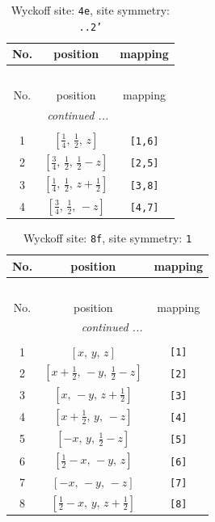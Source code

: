 \documentclass[fleqn,8pt]{jsarticle}
\begin{document}
\renewcommand{\arraystretch}{1.2}
\begin{longtable}{ccc}
\caption{Wyckoff site: {\tt 4e}, site symmetry: {\tt ..2'}}
 \\
 \hline \hline
No. & position & mapping \\ \hline \endfirsthead

\multicolumn{2}{l}{\tablename\ \thetable{}} \\
 \hline \hline
No. & position & mapping \\ \hline \endhead

 \hline \hline
\multicolumn{2}{r}{\footnotesize\it continued ...} \\ \endfoot

 \hline \hline
\multicolumn{2}{r}{} \\ \endlastfoot

1 & $\left[ \frac{1}{4},\, \frac{1}{2},\, z \right]$ & {\tt [1,6]} \\ \hline
2 & $\left[ \frac{3}{4},\, \frac{1}{2},\, \frac{1}{2} - z \right]$ & {\tt [2,5]} \\ \hline
3 & $\left[ \frac{1}{4},\, \frac{1}{2},\, z + \frac{1}{2} \right]$ & {\tt [3,8]} \\ \hline
4 & $\left[ \frac{3}{4},\, \frac{1}{2},\, - z \right]$ & {\tt [4,7]} \\
\end{longtable}
\renewcommand{\arraystretch}{1.2}
\begin{longtable}{ccc}
\caption{Wyckoff site: {\tt 8f}, site symmetry: {\tt 1}}
 \\
 \hline \hline
No. & position & mapping \\ \hline \endfirsthead

\multicolumn{2}{l}{\tablename\ \thetable{}} \\
 \hline \hline
No. & position & mapping \\ \hline \endhead

 \hline \hline
\multicolumn{2}{r}{\footnotesize\it continued ...} \\ \endfoot

 \hline \hline
\multicolumn{2}{r}{} \\ \endlastfoot

1 & $\left[ x,\, y,\, z \right]$ & {\tt [1]} \\ \hline
2 & $\left[ x + \frac{1}{2},\, - y,\, \frac{1}{2} - z \right]$ & {\tt [2]} \\ \hline
3 & $\left[ x,\, - y,\, z + \frac{1}{2} \right]$ & {\tt [3]} \\ \hline
4 & $\left[ x + \frac{1}{2},\, y,\, - z \right]$ & {\tt [4]} \\ \hline
5 & $\left[ - x,\, y,\, \frac{1}{2} - z \right]$ & {\tt [5]} \\ \hline
6 & $\left[ \frac{1}{2} - x,\, - y,\, z \right]$ & {\tt [6]} \\ \hline
7 & $\left[ - x,\, - y,\, - z \right]$ & {\tt [7]} \\ \hline
8 & $\left[ \frac{1}{2} - x,\, y,\, z + \frac{1}{2} \right]$ & {\tt [8]} \\
\end{longtable}
\end{document}
